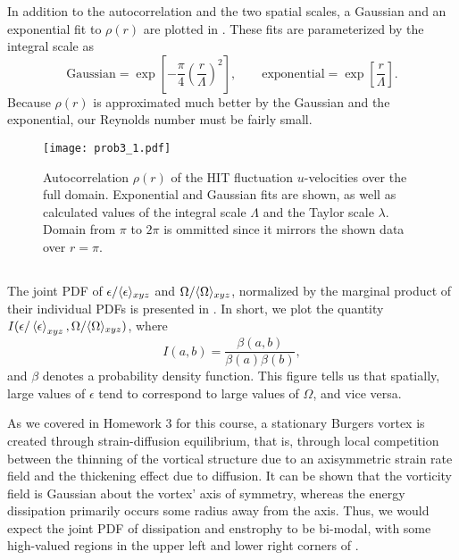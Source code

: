 \documentclass[11pt]{article}
\begin{document}
In addition to the autocorrelation and the two spatial scales, a Gaussian and an exponential fit to $\rho(r)$ are plotted in . These fits are parameterized by the integral scale as
\[
\text{Gaussian} = \exp \left[ - \frac{\pi}{4} \left( \frac{r}{\Lambda} \right)^2 \right]
,
\qquad
\text{exponential} = \exp \left[ \frac{r}{\Lambda} \right]
.
\]
Because $\rho(r)$ is approximated much better by the Gaussian and the exponential, our Reynolds number must be fairly small.

\begin{figure}[t]
\centering
\texttt{[image: prob3\_1.pdf]}
\\[6pt]
\caption{Autocorrelation $\rho(r)$ of the HIT fluctuation $u$-velocities over the full domain. Exponential and Gaussian fits are shown, as well as calculated values of the integral scale $\Lambda$ and the Taylor scale $\lambda$. Domain from $\pi$ to $2\pi$ is ommitted since it mirrors the shown data over $r=\pi$.}
\label{fig:prob_3_1_autocorrelation}
\end{figure}

\subsection{}

The joint PDF of $\epsilon / \langle \epsilon \rangle_{xyz}$ and $\Omega / \langle \Omega \rangle_{xyz}$, normalized by the marginal product of their individual PDFs is presented in . In short, we plot the quantity $I( \epsilon / \left< \epsilon \right>_{xyz}, \Omega / \langle \Omega \rangle_{xyz})$, where
\begin{equation}
I(a,b) = \frac{\beta(a,b)}{\beta(a) \beta(b)}
,
\end{equation}
and $\beta$ denotes a probability density function. This figure tells us that spatially, large values of $\epsilon$ tend to correspond to large values of $\Omega$, and vice versa.

As we covered in Homework 3 for this course, a stationary Burgers vortex is created through strain-diffusion equilibrium, that is, through local competition between the thinning of the vortical structure due to an axisymmetric strain rate field and the thickening effect due to diffusion. It can be shown that the vorticity field is Gaussian about the vortex' axis of symmetry, whereas the energy dissipation primarily occurs some radius away from the axis. Thus, we would expect the joint PDF of dissipation and enstrophy to be bi-modal, with some high-valued regions in the upper left and lower right corners of .
\end{document}
